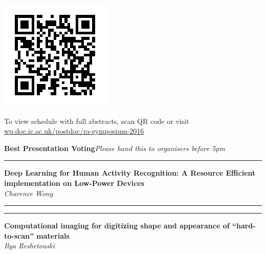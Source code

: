 \documentclass[11pt]{article}
\newcommand{\talk}[1]{\Large\flushleft\textbf{#1}\\}
\newcommand{\speaker}[1]{\textit{#1}\\}
\newcommand{\separator}{\noindent\rule{\linewidth}{0.1mm}}
\newcommand{\hstrut}{\noindent\rule{\linewidth}{0pt}}
\begin{document}
\vfill
\noindent
\begin{minipage}{0.15\linewidth}
  \includegraphics[width=\linewidth]{qr.png}
\end{minipage}
\begin{minipage}{0.85\linewidth}
\large
\flushright%
To view schedule with full abstracts, scan QR code or visit
\href{http://wp.doc.ic.ac.uk/postdoc/ra-symposium-2016}
     {wp.doc.ic.ac.uk/postdoc/ra-symposium-2016}
\end{minipage}
\clearpage
\noindent
\textbf{\flushleft\LARGE Best Presentation Voting}\hfill\textit{Please hand this to organisers before 5pm}\\
\noindent
\begin{minipage}[t]{0.49\linewidth}
\separator%
\talk{Deep Learning for Human Activity Recognition: A Resource Efficient
      implementation on Low-Power Devices}
\speaker{Charence Wong}
\end{minipage}
\begin{minipage}[t]{0.02\linewidth}
\hstrut%
\end{minipage}
\begin{minipage}[t]{0.49\linewidth}
\separator%
\talk{Computational imaging for digitizing shape and appearance of
      ``hard-to-scan'' materials}
\speaker{Ilya Reshetouski}
\end{minipage}
\end{document}
